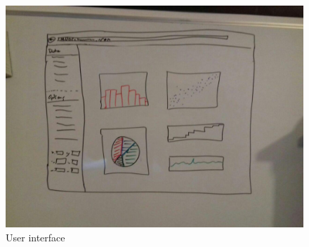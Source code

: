 \documentclass{article}
\begin{document}
\begin{figure}[!h]
\centering
    \includegraphics[width=\textwidth]{Prototype1.jpg}
	\caption{User interface}
	\label{fig1}
\end{figure}
\end{document}

